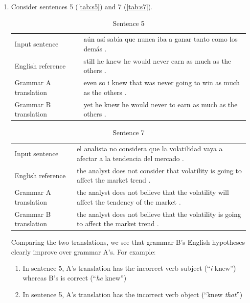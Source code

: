 \documentclass[a4paper,oneside,reqno]{amsart}
\begin{document}
\begin{enumerate}[label=\arabic*.]
    \begin{enumerate}[label=(\alph*)]
      \item
        Consider sentences 5 (\autoref{tab:s5}) and 7 (\autoref{tab:s7}).
        \begin{table}[H]
          \begin{tabular}{p{5cm}p{10cm}}
            Input sentence & aún así sabía que nunca iba a ganar tanto como los demás . \\
            English reference & still he knew he would never earn as much as the others . \\
            Grammar A translation & even so i knew that was never going to win as much as the others . \\
            Grammar B translation & yet he knew he would never to earn as much as the others . \\
          \end{tabular}
          \caption{Sentence 5}
          \label{tab:s5}
        \end{table}
        \begin{table}[H]
          \begin{tabular}{p{5cm}p{10cm}}
            Input sentence & el analista no considera que la volatilidad vaya a afectar a la tendencia del mercado .  \\
            English reference & the analyst does not consider that volatility is going to affect the market trend .  \\
            Grammar A translation & the analyst does not believe that the volatility will affect the tendency of the market .  \\
            Grammar B translation & the analyst does not believe that the volatility is going to affect the market trend .  \\
          \end{tabular}
          \caption{Sentence 7}
          \label{tab:s7}
        \end{table}
        Comparing the two translations, we see that grammar B's English
        hypotheses clearly improve over grammar A's. For example:
        \begin{enumerate}
          \item In sentence 5, A's translation has the incorrect verb subject
            (``\emph{i} knew'') whereas B's is correct (``\emph{he} knew'')
          \item In sentence 5, A's translation has the incorrect verb object (``knew \emph{that}'')

\end{enumerate}
\end{enumerate}
\end{enumerate}
\end{document}
